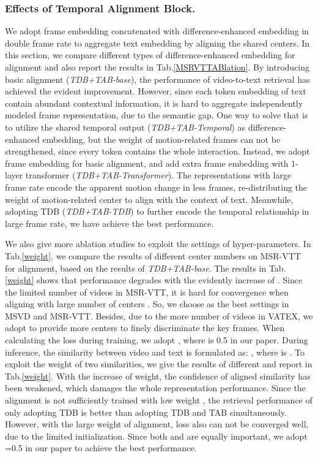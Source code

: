 \documentclass[final]{cvpr}
\begin{document}
\subsubsection{Effects of Temporal Alignment Block.} We adopt frame embedding concatenated with difference-enhanced embedding in double frame rate to aggregate text embedding by aligning the shared centers. In this section, we compare different types of difference-enhanced embedding for alignment and also report the results in Tab.\ref{MSRVTTABlation}. By introducing basic alignment (\textit{TDB+TAB-base}), the performance of video-to-text retrieval has achieved the evident improvement. However, since each token embedding of text contain abundant contextual information, it is hard to aggregate independently modeled frame representation, due to the semantic gap. One way to solve that is to utilize the shared temporal output (\textit{TDB+TAB-Temporal}) as difference-enhanced embedding, but the weight of motion-related frames can not be strengthened, since every token contains the whole interaction. Instead, we adopt frame embedding for basic alignment, and add extra frame embedding with 1-layer transformer (\textit{TDB+TAB-Transformer}).
The representations with large frame rate encode the apparent motion change in less frames, re-distributing the weight of motion-related center to align with the context of text. Meanwhile, adopting TDB (\textit{TDB+TAB-TDB}) to further encode the temporal relationship in large frame rate, we have achieve the best performance.

We also give more ablation studies to exploit the settings of hyper-parameters. In Tab.\ref{weight}, we compare the results of different center numbers  on MSR-VTT for alignment, based on the results of \textit{TDB+TAB-base}. The results in Tab.\ref{weight} shows that performance degrades with the evidently increase of .  Since the limited number of videos in MSR-VTT, it is hard for convergence when aligning with large number of centers . So, we choose  as the best settings in MSVD and MSR-VTT. Besides, due to the more number of videos in VATEX, we adopt  to provide more centers to finely discriminate the key frames. When calculating the loss during training, we adopt , where  is 0.5 in our paper. During inference, the similarity between video and text is formulated as: , where  is . To exploit the weight of two similarities, we give the results of different  and report in Tab.\ref{weight}. With the increase of weight, the confidence of aligned similarity has been weakened, which damages the whole representation performance. Since the alignment 
is not sufficiently trained with low weight , the retrieval performance of only adopting TDB is better than adopting TDB and TAB simultaneously. However, with the large weight of alignment, loss also can not be converged well, due to the limited initialization. Since both  and  are equally important, we adopt =0.5 in our paper to achieve the best performance.
\end{document}
